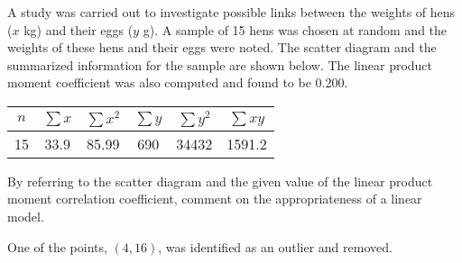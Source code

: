 \begin{problem}
    A study was carried out to investigate possible links between the weights of hens ($x$ kg) and their eggs ($y$ g). A sample of 15 hens was chosen at random and the weights of these hens and their eggs were noted. The scatter diagram and the summarized information for the sample are shown below. The linear product moment coefficient was also computed and found to be 0.200.

    \begin{figure}[H]
        \centering
    \end{figure}

    \begin{table}[H]
        \centering
        \begin{tabular}{|c|c|c|c|c|c|}
            \hline
            $n$ & $\sum x$ & $\sum x^2$ & $\sum y$ & $\sum y^2$ & $\sum xy$ \\ \hline
            15 & 33.9 & 85.99 & 690 & 34432 & 1591.2 \\ \hline
        \end{tabular}
    \end{table}

    By referring to the scatter diagram and the given value of the linear product moment correlation coefficient, comment on the appropriateness of a linear model.

    One of the points, $(4, 16)$, was identified as an outlier and removed.


\end{problem}
